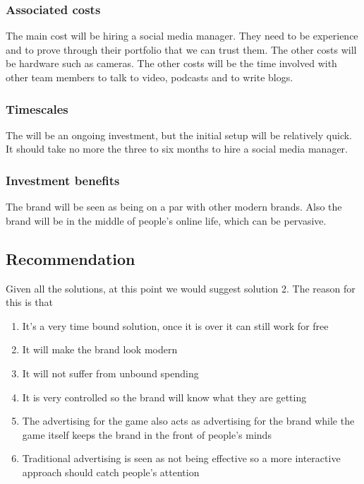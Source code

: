 \documentclass{article}
\begin{document}
\subsubsection{Associated costs}
The main cost will be hiring a social media manager. They need to be experience and to prove through their portfolio that we can trust them. 
The other costs will be hardware such as cameras.
The other costs will be the time involved with other team members to talk to video, podcasts and to write blogs.

\subsubsection{Timescales}
The will be an ongoing investment, but the initial setup will be relatively quick. It should take no more the three to six months to hire a social media manager.

\subsubsection{Investment benefits}
The brand will be seen as being on a par with other modern brands.
Also the brand will be in the middle of people's online life, which can be pervasive. 

\subsection{Recommendation}
Given all the solutions, at this point we would suggest solution 2. 
The reason for this is that
\begin{enumerate}
    \item It's a very time bound solution, once it is over it can still work for free
    \item It will make the brand look modern
    \item It will not suffer from unbound spending
    \item It is very controlled so the brand will know what they are getting
    \item The advertising for the game also acts as advertising for the brand while the game itself keeps the brand in the front of people's minds
    \item Traditional advertising is seen as not being effective so a more interactive approach should catch people's attention
\end{enumerate}
 
\end{document}
